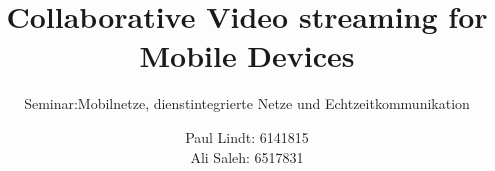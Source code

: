 \documentclass{mythesis}
\title{Collaborative Video streaming for Mobile Devices}
\subtitle{Seminar:Mobilnetze, dienstintegrierte Netze und Echtzeitkommunikation}
\author{Paul Lindt: 6141815 \\ Ali Saleh: 6517831\vspace*{1cm}}
\begin{document}
 
\begin{frontmatter}
  
\end{frontmatter}

\begin{mainmatter}
  
  
  
\end{mainmatter}

%   

\begin{backmatter}
  
\end{backmatter}

\end{document}
